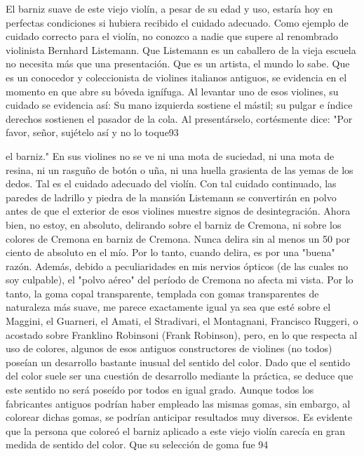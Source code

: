 El barniz suave de este viejo violín, a pesar de su edad y uso, estaría hoy en perfectas condiciones si hubiera recibido el cuidado adecuado. Como ejemplo de cuidado correcto para el violín, no conozco a nadie que supere al renombrado violinista Bernhard Listemann. Que Listemann es un caballero de la vieja escuela no necesita más que una presentación. Que es un artista, el mundo lo sabe. Que es un conocedor y coleccionista de violines italianos antiguos, se evidencia en el momento en que abre su bóveda ignífuga. Al levantar uno de esos violines, su cuidado se evidencia así: Su mano izquierda sostiene el mástil; su pulgar e índice derechos sostienen el pasador de la cola. Al presentárselo, cortésmente
dice:	"Por favor, señor, sujételo así y no lo toque93

el barniz." En sus violines no se ve ni una mota de suciedad, ni una mota de resina, ni un rasguño de botón o uña, ni una huella grasienta de las yemas de los dedos. Tal es el cuidado adecuado del violín. Con tal cuidado continuado, las paredes de ladrillo y piedra de la mansión Listemann se convertirán en polvo antes de que el exterior de esos violines muestre signos de desintegración. Ahora bien, no estoy, en absoluto, delirando sobre el barniz de Cremona, ni sobre los colores de Cremona en barniz de Cremona. Nunca delira sin al menos un 50 por ciento de absoluto en el mío. Por lo tanto, cuando delira, es por una "buena" razón. Además, debido a peculiaridades en mis nervios ópticos (de las cuales no soy culpable), el "polvo aéreo" del período de Cremona no afecta mi vista. Por lo tanto, la goma copal transparente, templada con gomas transparentes de naturaleza más suave, me parece exactamente igual ya sea que esté sobre el Maggini, el Guarneri, el Amati, el Stradivari, el Montagnani, Francisco Ruggeri, o acostado sobre Franklino Robinsoni (Frank Robinson), pero, en lo que respecta al uso de colores, algunos de esos antiguos constructores de violines (no todos) poseían un desarrollo bastante inusual del sentido del color. Dado que el sentido del color suele ser una cuestión de desarrollo mediante la práctica, se deduce que este sentido no será poseído por todos en igual grado. Aunque todos los fabricantes antiguos podrían haber empleado las mismas gomas, sin embargo, al colorear dichas gomas, se podrían anticipar resultados muy diversos. Es evidente que la persona que coloreó el barniz aplicado a este viejo violín carecía en gran medida de sentido del color. Que su selección de goma fue
94

